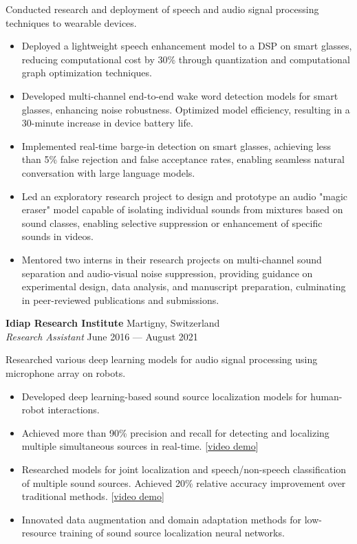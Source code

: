 \documentclass[a4paper,9pt]{extarticle} %
\begin{document}
Conducted research and deployment of speech and audio signal processing techniques to wearable devices.
\vspace{-.9\parskip}
\begin{itemize}[nosep]
  \item Deployed a lightweight speech enhancement model to a DSP on smart glasses, reducing computational cost by 30\% through quantization and computational graph optimization techniques.
  \item Developed multi-channel end-to-end wake word detection models for smart glasses, enhancing noise robustness. Optimized model efficiency, resulting in a 30-minute increase in device battery life.
  \item Implemented real-time barge-in detection on smart glasses, achieving less than 5\% false rejection and false acceptance rates, enabling seamless natural conversation with large language models.
  \item Led an exploratory research project to design and prototype an audio "magic eraser" model capable of isolating individual sounds from mixtures based on sound classes, enabling selective suppression or enhancement of specific sounds in videos.
  \item Mentored two interns in their research projects on multi-channel sound separation and audio-visual noise suppression, providing guidance on experimental design, data analysis, and manuscript preparation, culminating in peer-reviewed publications and submissions.
\end{itemize}

\textbf{Idiap Research Institute}  \hfill Martigny, Switzerland \\
\textit{Research Assistant} \hfill June 2016 --- August 2021%
\vspace{-.4\parskip}

Researched various deep learning models for audio signal processing using microphone array on robots.
\vspace{-.9\parskip}
\begin{itemize}[nosep]
  \item Developed deep learning-based sound source localization models for human-robot interactions.
  \item Achieved more than 90\% precision and recall for detecting and localizing multiple simultaneous sources in real-time. [\href{https://www.youtube.com/watch?v=_4EwuVlE_pU}{video demo}]
  \item Researched models for joint localization and speech/non-speech classification of multiple sound sources. Achieved 20\% relative accuracy improvement over traditional methods. [\href{https://www.youtube.com/watch?v=O7bQvg03RTc}{video demo}]
  \item Innovated data augmentation and domain adaptation methods for low-resource training of sound source localization neural networks.
\end{itemize}
\end{document}
